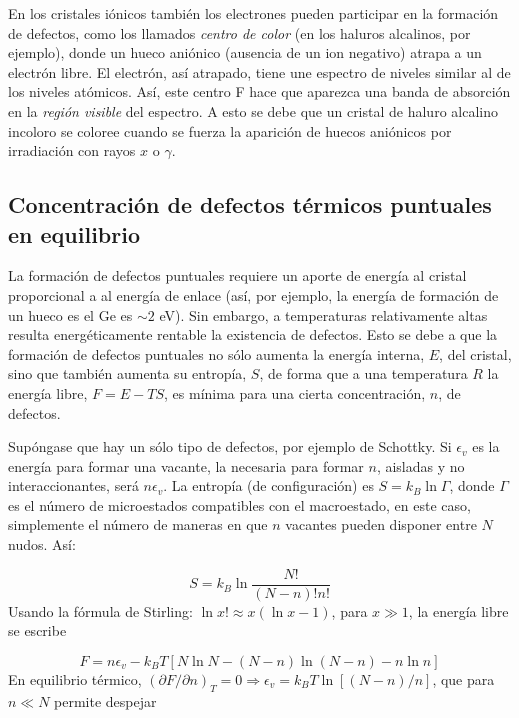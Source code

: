 En los cristales iónicos también los electrones pueden participar en la formación de defectos, como los llamados {\it centro de color} (en los haluros alcalinos, por ejemplo), donde un hueco aniónico (ausencia de un ion negativo) atrapa a un electrón libre. El electrón, así atrapado, tiene une espectro de niveles similar al de los niveles atómicos. Así, este centro F hace que aparezca una banda de absorción en la {\it región visible} del espectro. A esto se debe que un cristal de haluro alcalino incoloro se coloree cuando se fuerza la aparición de huecos aniónicos por irradiación con rayos $x$ o $\gamma$.


\subsection{Concentración de defectos térmicos puntuales en equilibrio} \label{Subsec:01-06-02}

La formación de defectos puntuales requiere un aporte de energía al cristal proporcional a al energía de enlace (así, por ejemplo, la energía de formación de un hueco es el Ge es $\sim 2$ eV). Sin embargo, a temperaturas relativamente altas resulta energéticamente rentable la existencia de defectos. Esto se debe a que la formación de defectos puntuales no sólo aumenta la energía interna, $E$, del cristal, sino que también aumenta su entropía, $S$, de forma que a una temperatura $R$ la energía libre, $F=E-TS$, es mínima para una cierta concentración, $n$, de defectos. 

Supóngase que hay un sólo tipo de defectos, por ejemplo de Schottky. Si $\epsilon_v$ es la energía para formar una vacante, la necesaria para formar $n$, aisladas y no interaccionantes, será $n\epsilon_v$. La entropía (de configuración) es $S=k_B \ln \Gamma$, donde $\Gamma$ es el número de microestados compatibles con el macroestado, en este caso, simplemente el número de maneras en que $n$ vacantes pueden disponer entre $N$ nudos. Así:

\begin{equation}
    S = k_B \ln \frac{N!}{(N-n)! n!}
\end{equation}
Usando la fórmula de Stirling: $\ln x! \approx x(\ln x - 1)$, para $x\gg 1$, la energía libre se escribe

\begin{equation}
    F = n \epsilon_v - k_B T [N \ln N - (N-n) \ln (N-n) - n \ln n]
\end{equation}
En equilibrio térmico, $(\partial F / \partial n)_T = 0 \Rightarrow \epsilon_v = k_B T \ln [(N-n)/n]$, que para $n\ll  N$ permite despejar

